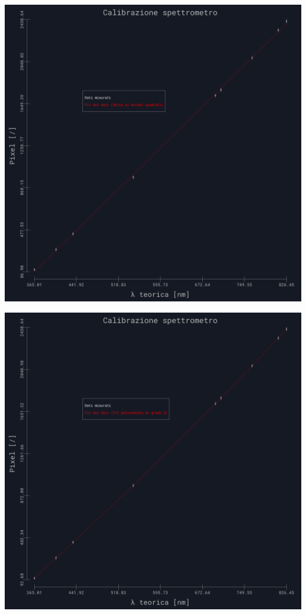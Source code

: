 \documentclass{article}
\begin{document}
\begin{center}
    \begin{minipage}{0.45\textwidth} %
        \centering
        \includegraphics[width=1\linewidth]{../images/grafico13.png} %
        \label{grafico:13}
    \end{minipage}
    \begin{minipage}{0.45\textwidth} %
        \centering
        \includegraphics[width=1\linewidth]{../images/grafico13_2.png} %

\end{minipage}
\end{center}
\end{document}
